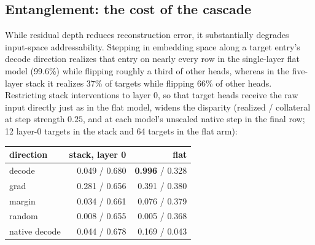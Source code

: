 \subsection{Entanglement: the cost of the cascade}
\label{sec:entangle}

While residual depth reduces reconstruction error, it substantially degrades
input-space addressability. Stepping in embedding space along a target
entry's decode direction realizes that entry on nearly every row in the
single-layer flat model (99.6\%) while flipping roughly a third of other
heads, whereas in the five-layer stack it realizes 37\% of targets while
flipping 66\% of other heads. Restricting stack interventions to layer 0, so
that target heads receive the raw input directly just as in the flat
model, widens the disparity (realized / collateral at step strength $0.25$,
and at each model's unscaled native step in the final row; 12 layer-0
targets in the stack and 64 targets in the flat arm):

\begin{center}\small
\begin{tabular}{@{}lrr@{}}
\toprule
direction & stack, layer 0 & flat \\
\midrule
decode & 0.049 / 0.680 & \textbf{0.996} / 0.328 \\
grad   & 0.281 / 0.656 & 0.391 / 0.380 \\
margin & 0.034 / 0.661 & 0.076 / 0.379 \\
random & 0.008 / 0.655 & 0.005 / 0.368 \\
\midrule
native decode & 0.044 / 0.678 & 0.169 / 0.043 \\
\bottomrule
\end{tabular}
\end{center}

